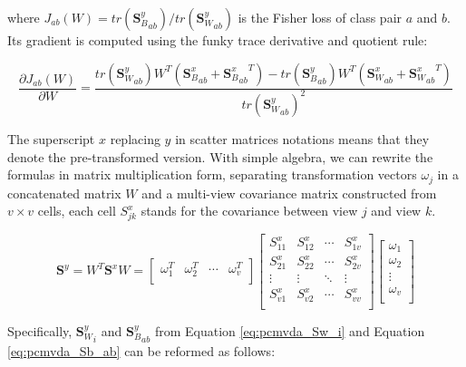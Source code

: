         where $J_{ab}\left(W\right)={tr\left({\boldsymbol{S}_B^y}_{ab}\right)}/{tr\left({\boldsymbol{S}_W^y}_{ab}\right)}$ is the Fisher loss of class pair $a$ and $b$. Its gradient is computed using the funky trace derivative and quotient rule:

        \begin{equation}
            \frac{\partial J_{ab}\left(W\right)}{\partial W}=\frac{tr\left({\boldsymbol{S}_W^y}_{ab}\right)W^T\left({\boldsymbol{S}_B^x}_{ab}+{{\boldsymbol{S}_B^x}_{ab}}^T\right)-tr\left({\boldsymbol{S}_B^y}_{ab}\right)W^T\left({\boldsymbol{S}_W^x}_{ab}+{{\boldsymbol{S}_W^x}_{ab}}^T\right)}{{tr\left({\boldsymbol{S}_W^y}_{ab}\right)}^2}
            \label{eq:grad_Jab}
        \end{equation}

        The superscript $x$ replacing $y$ in scatter matrices notations means that they denote the pre-transformed version. With simple algebra, we can rewrite the formulas in matrix multiplication form, separating transformation vectors $\omega_j$ in a concatenated matrix $W$ and a multi-view covariance matrix constructed from $v\times v$ cells, each cell $S^x_{jk}$ stands for the covariance between view $j$ and view $k$.

        \begin{equation}
            \boldsymbol{S}^y=W^T\boldsymbol{S}^xW=\left[\begin{matrix}\omega_1^T&\omega_2^T&\cdots&\omega_v^T\\\end{matrix}\right]\left[\begin{matrix}S^x_{11}&S^x_{12}&\cdots&S^x_{1v}\\S^x_{21}&S^x_{22}&\cdots&S^x_{2v}\\\vdots&\vdots&\ddots&\vdots\\S^x_{v1}&S^x_{v2}&\cdots&S^x_{vv}\\\end{matrix}\right]\left[\begin{matrix}\omega_1\\\omega_2\\\vdots\\\omega_v\\\end{matrix}\right]
        \end{equation}

        Specifically, ${\boldsymbol{S}^y_W}_{i}$ and ${\boldsymbol{S}^y_B}_{ab}$ from Equation \eqref{eq:pcmvda_Sw_i} and Equation \eqref{eq:pcmvda_Sb_ab} can be reformed as follows:

